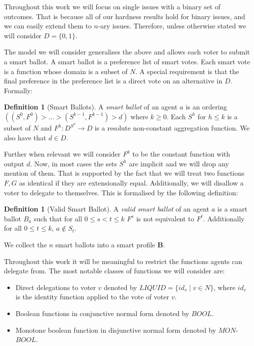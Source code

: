 \documentclass[11pt,a4paper, titlepage]{article}
\theoremstyle{definition}
\newtheorem{definition}[theorem]{Definition}
\begin{document}
Throughout this work we will focus on single issues with a binary set of outcomes. 
That is because all of our hardness results hold for binary issues, and we can easily extend them to $n$-ary issues. 
Therefore, unless otherwise stated we will consider $D = \{0, 1\}$.

The model we will consider generalises the above and allows each voter to submit a smart ballot. 
A smart ballot is a preference list of smart votes. 
Each smart vote is a function whose domain is a subset of $N$. 
A special requirement is that the final preference in the preference list is a direct vote on an alternative in $D$. 
Formally:

\begin{definition}[Smart Ballots]
    A \emph{smart ballot} of an agent $a$ is an ordering $( (S^0, F^0) > \ldots > (S^{k-1}, F^{k-1}) > d)$ where $k \geq 0$. Each $S^h$ for $h \leq k$ is a subset of $N$ and $F^h \colon D^{S^h} \longrightarrow D$ is a resolute non-constant aggregation function. We also have that $d \in D$.   
\end{definition}

Further when relevant we will consider $F^{k}$ to be the constant function with output $d$. 
Now, in most cases the sets $S^h$ are implicit and we will drop any mention of them. 
That is supported by the fact that we will treat two functions $F, G$ as identical if they are extensionally equal. 
Additionally, we will disallow a voter to delegate to themselves. 
This is formalised by the following definition:

\begin{definition}[Valid Smart Ballot]
    A \emph{valid smart ballot} of an agent $a$ is a smart ballot $B_a$ such that for all $ 0 \leq s < t \leq k$ $F^s$ is not equivalent to $F^t$. Additionally for all $0 \leq t \leq k$, $a \notin S_t$.
\end{definition}


We collect the $n$ smart ballots into a smart profile $\mathbf{B}$.

Throughout this work it will be meaningful to restrict the functions agents can delegate from. The most notable classes of functions we will consider are: 

\begin{itemize}
    \item Direct delegations to voter $v$ denoted by $\mathit{LIQUID} = \{\mathit{id}_v \mid v \in N\}$, where $\mathit{id}_v$ is the identity function applied to the vote of voter $v$.
    \item Boolean functions in conjunctive normal form denoted by $\mathit{BOOL}$. 
    \item Monotone boolean function in disjunctive normal form denoted by $\mathit{MON}$-$\mathit{BOOL}$.
\end{itemize}
\end{document}
